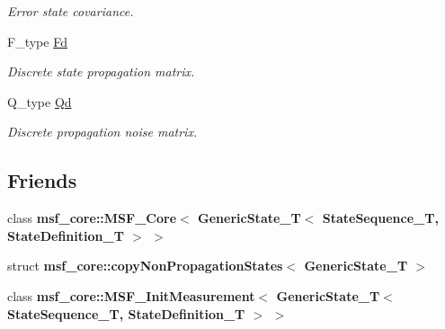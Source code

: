 \begin{DoxyCompactItemize}
\begin{DoxyCompactList}\small\item\em Error state covariance. \end{DoxyCompactList}\item 
\hypertarget{structmsf__core_1_1GenericState__T_ad280aac57eb229c02d49172645159b60}{F\-\_\-type \hyperlink{structmsf__core_1_1GenericState__T_ad280aac57eb229c02d49172645159b60}{Fd}}\label{structmsf__core_1_1GenericState__T_ad280aac57eb229c02d49172645159b60}

\begin{DoxyCompactList}\small\item\em Discrete state propagation matrix. \end{DoxyCompactList}\item 
\hypertarget{structmsf__core_1_1GenericState__T_a68fa9e618784839b121ebbf2bbb42040}{Q\-\_\-type \hyperlink{structmsf__core_1_1GenericState__T_a68fa9e618784839b121ebbf2bbb42040}{Qd}}\label{structmsf__core_1_1GenericState__T_a68fa9e618784839b121ebbf2bbb42040}

\begin{DoxyCompactList}\small\item\em Discrete propagation noise matrix. \end{DoxyCompactList}\end{DoxyCompactItemize}
\subsection*{Friends}
\begin{DoxyCompactItemize}
\item 
\hypertarget{structmsf__core_1_1GenericState__T_af712399c37091d0c5b71a0dbe27cf4ae}{class {\bfseries msf\-\_\-core\-::\-M\-S\-F\-\_\-\-Core$<$ Generic\-State\-\_\-\-T$<$ State\-Sequence\-\_\-\-T, State\-Definition\-\_\-\-T $>$ $>$}}\label{structmsf__core_1_1GenericState__T_af712399c37091d0c5b71a0dbe27cf4ae}

\item 
\hypertarget{structmsf__core_1_1GenericState__T_a8a2e95cafb3556e7b1e658353f6cd74e}{struct {\bfseries msf\-\_\-core\-::copy\-Non\-Propagation\-States$<$ Generic\-State\-\_\-\-T $>$}}\label{structmsf__core_1_1GenericState__T_a8a2e95cafb3556e7b1e658353f6cd74e}

\item 
\hypertarget{structmsf__core_1_1GenericState__T_aa5650f4d3b3f29f901872e699b9e6398}{class {\bfseries msf\-\_\-core\-::\-M\-S\-F\-\_\-\-Init\-Measurement$<$ Generic\-State\-\_\-\-T$<$ State\-Sequence\-\_\-\-T, State\-Definition\-\_\-\-T $>$ $>$}}\label{structmsf__core_1_1GenericState__T_aa5650f4d3b3f29f901872e699b9e6398}

\end{DoxyCompactItemize}


